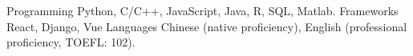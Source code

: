 
\begin{cvskills}

  \cvskill
    {Programming}
    {Python, C/C++, JavaScript, Java, R, SQL, Matlab.}
  \cvskill
    {Frameworks}
    {React, Django, Vue}
  \cvskill
    {Languages}
    {Chinese (native proficiency), English (professional proficiency, TOEFL: 102).}

\end{cvskills}
